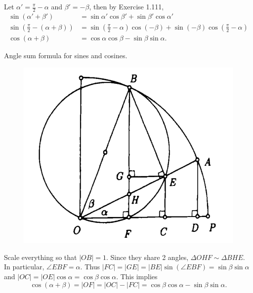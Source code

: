 \documentclass[twoside,10pt]{article}
\begin{document}
Let $\alpha' = \frac{\pi}{2} -\alpha$ and $\beta'=-\beta$, then by Exercise 1.111,
\begin{align*}
	\sin(\alpha'+\beta') &= \sin \alpha' \cos \beta' + \sin \beta' \cos \alpha' \\
	\sin\left( \frac{\pi}{2} -(\alpha+\beta) \right) &= \sin\left( \frac{\pi}{2} -\alpha \right)\cos(-\beta) + \sin(-\beta) \cos\left( \frac{\pi}{2} -\alpha \right) \\
	\cos(\alpha+\beta) &= \cos \alpha \cos \beta - \sin \beta \sin \alpha.
\end{align*}

\newpage

\begin{exer}[1.114]
	Angle sum formula for sines and cosines.
\end{exer}

\begin{figure}[H]
	\centering
	\includegraphics[scale=0.8]{fig/114.pdf}
\end{figure}

Scale everything so that $|OB|=1$. Since they share 2 angles, $\Delta OHF \sim \Delta BHE$. In particular, $\angle EBF = \alpha$. Thus $|FC|=|GE|=|BE| \sin (\angle EBF) = \sin \beta \sin \alpha$ and $|OC|=|OE| \cos \alpha = \cos \beta \cos \alpha$. This implies
\[
	\cos(\alpha+\beta) = |OF| = |OC|-|FC| = \cos \beta \cos \alpha - \sin \beta \sin \alpha.
\] 
\end{document}
